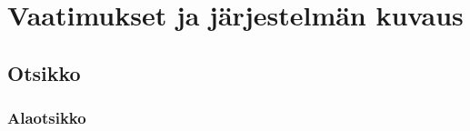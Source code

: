 \chapter{Vaatimukset ja järjestelmän kuvaus} %
\label{keruu} %
\thispagestyle{fancy} %

\section{Otsikko}  %

\lipsum

\subsection{Alaotsikko}

\lipsum[1-3]